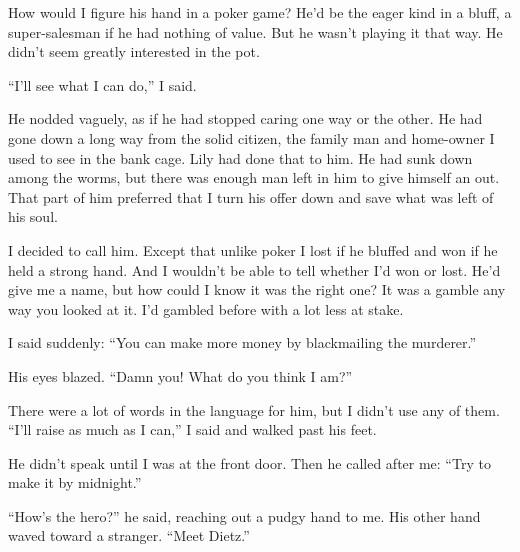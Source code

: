 \documentclass{novel}
\begin{document}
How would I figure his hand in a poker game? He’d be the eager kind in a bluff, a super-salesman if he had nothing of value. But he wasn’t playing it that way. He didn’t seem greatly interested in the pot.

“I’ll see what I can do,” I said.

He nodded vaguely, as if he had stopped caring one way or the other. He had gone down a long way from the solid citizen, the family man and home-owner I used to see in the bank cage. Lily had done that to him. He had sunk down among the worms, but there was enough man left in him to give himself an out. That part of him preferred that I turn his offer down and save what was left of his soul.

I decided to call him. Except that unlike poker I lost if he bluffed and won if he held a strong hand. And I wouldn’t be able to tell whether I’d won or lost. He’d give me a name, but how could I know it was the right one? It was a gamble any way you looked at it. I’d gambled before with a lot less at stake.

I said suddenly: “You can make more money by blackmailing the murderer.”

His eyes blazed. “Damn you! What do you think I am?”

There were a lot of words in the language for him, but I didn’t use any of them. “I’ll raise as much as I can,” I said and walked past his feet.

He didn’t speak until I was at the front door. Then he called after me: “Try to make it by midnight.”

\vspace{2\nbs}
\clearpage
\thispagestyle{empty}


\begin{ChapterStart}
\vspace{3\nbs}
\end{ChapterStart}

“How’s the hero?” he said, reaching out a pudgy hand to me. His other hand waved toward a stranger. “Meet Dietz.”
\end{document}
